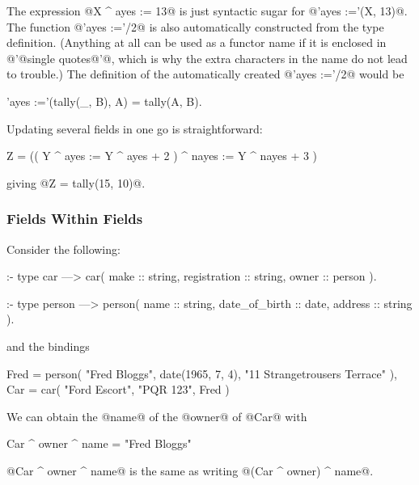 The expression @X ^ ayes := 13@ is just syntactic sugar for
@'ayes :='(X, 13)@.  The function @'ayes :='/2@ is also automatically
constructed from the type definition.  (Anything at all can be used as a
functor name if it is enclosed in @'@single quotes@'@, which is why the
extra characters in the name do not lead to trouble.)  The definition of
the automatically created @'ayes :='/2@ would be
\begin{myverbatim}
'ayes :='(tally(_, B), A) = tally(A, B).
\end{myverbatim}

Updating several fields in one go is straightforward:
\begin{myverbatim}
    Z = (( Y ^ ayes  := Y ^ ayes  + 2 )
             ^ nayes := Y ^ nayes + 3 )
\end{myverbatim}
giving @Z = tally(15, 10)@.

\subsubsection{Fields Within Fields}

Consider the following:
\begin{myverbatim}
:- type car
    --->    car(
                make            :: string,
                registration    :: string,
                owner           :: person
            ).

:- type person
    --->    person(
                name            :: string,
                date_of_birth   :: date,
                address         :: string
            ).
\end{myverbatim}
and the bindings
\begin{myverbatim}
    Fred = person(
               "Fred Bloggs",
               date(1965, 7, 4),
               "11 Strangetrousers Terrace"
           ),
    Car  = car( 
               "Ford Escort",
               "PQR 123",
               Fred
           )
\end{myverbatim}
We can obtain the @name@ of the @owner@ of @Car@ with
\begin{myverbatim}
    Car ^ owner ^ name = "Fred Bloggs"
\end{myverbatim}
@Car ^ owner ^ name@ is the same as writing @(Car ^ owner) ^ name@.

